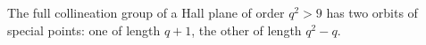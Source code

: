 The full collineation group of a Hall plane of order $q^2 > 9$ has two orbits of special points: one of length $q + 1$, the other of length $q^2 - q$.
